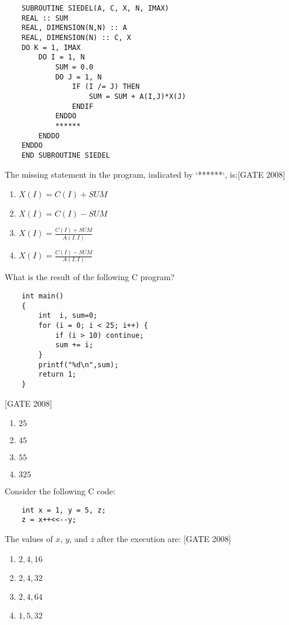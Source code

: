 \begin{verbatim}
    SUBROUTINE SIEDEL(A, C, X, N, IMAX)
    REAL :: SUM
    REAL, DIMENSION(N,N) :: A
    REAL, DIMENSION(N) :: C, X
    DO K = 1, IMAX
        DO I = 1, N
            SUM = 0.0
            DO J = 1, N
                IF (I /= J) THEN
                    SUM = SUM + A(I,J)*X(J)
                ENDIF
            ENDDO
            ******
        ENDDO
    ENDDO
    END SUBROUTINE SIEDEL
\end{verbatim}

The missing statement in the program, indicated by `******`, is:\hfill{[GATE 2008]}

\begin{multicols}{4}
\begin{enumerate}
    \item $ X(I) = C(I) + SUM $
    \item $ X(I) = C(I) - SUM $
    \item $ X(I) = \frac{C(I) + SUM}{A(I,I)} $
    \item $ X(I) = \frac{C(I) - SUM}{A(I,I)} $
\end{enumerate}
\end{multicols}

\item What is the result of the following C program?

\begin{verbatim}
    int main()
    {
        int  i, sum=0;
        for (i = 0; i < 25; i++) {
            if (i > 10) continue;
            sum += i;
        }
        printf("%d\n",sum);
        return 1;
    }
\end{verbatim}
\hfill{[GATE 2008]}

\begin{multicols}{4}
\begin{enumerate}
    \item $ 25 $
    \item $ 45 $
    \item $ 55 $
    \item $ 325 $
\end{enumerate}
\end{multicols}

\item Consider the following C code:

\begin{verbatim}
    int x = 1, y = 5, z;
    z = x++<<--y;
\end{verbatim}

The values of $ x $, $ y$, and $ z$ after the execution are:
\hfill{[GATE 2008]}
\begin{multicols}{4}
\begin{enumerate}
    \item $ 2, 4, 16 $
    \item $ 2, 4, 32 $
    \item $ 2, 4, 64 $
    \item $ 1, 5, 32 $
\end{enumerate}
\end{multicols}

